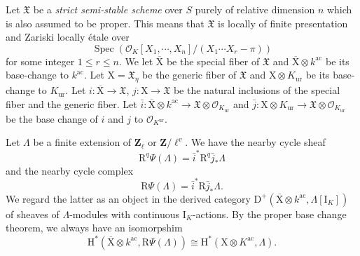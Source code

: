 \documentclass[10pt]{amsart}
\newcommand*\Z{\mathds{Z}}
\newcommand*\ZZ{|[draw,circle]| \Z_2}
\numberwithin{equation}{section}
\theoremstyle{plain}
\numberwithin{equation}{section}
\theoremstyle{definition}
\theoremstyle{remark}
\def\ac{\mathrm{ac}}
\def\ur{\mathrm{ur}}
\def\ac{\mathrm{ac}}
\DeclareMathOperator{\Spec}{Spec}
\def\calO{\mathcal{O}}
\def\ZZ{\mathbf{Z}}
\def\rmD{\mathrm{D}}
\def\rmH{\mathrm{H}}
\def\rmI{\mathrm{I}}
\def\rmX{\mathrm{X}}
\def\rmXbar{\overline{\rmX}}
\def\rmR{\mathrm{R}}
\begin{document}
Let $\mathfrak{X}$ be a \emph{strict semi-stable scheme} over $S$ purely of relative dimension $n$ which is also assumed to be proper. This means that $\mathfrak{X}$ is locally of finite presentation and Zariski locally \'{e}tale over $$\Spec(\calO_{K}[X_{1}, \cdots, X_{n}]/(X_{1}\cdots X_{r}-\pi))$$ for some integer $1\leq r\leq n$. We let $\overline{\rmX}$ be the special fiber of $\mathfrak{X}$ and $\overline{\rmX}\otimes{k^{\ac}}$ be its base-change to $k^{\ac}$. Let $\rmX=\mathfrak{X}_{\eta}$ be the generic fiber of $\mathfrak{X}$ and $\rmX\otimes{K_{\ur}}$ be its base-change to $K_{\ur}$. Let $i:\overline{\rmX}\rightarrow \mathfrak{X}$, $j: \rmX\rightarrow \mathfrak{X}$ be the natural inclusions of the special fiber and the generic fiber. Let $\bar{i}: \overline{\rmX}\otimes{k^{\ac}}\rightarrow \mathfrak{X}\otimes{\calO_{K_{\ur}}}$ and $\bar{j}: \rmX\otimes{K_{\ur}}\rightarrow \mathfrak{X}\otimes{\calO_{K_{\ur}}}$ be the base change of $i$ and $j$ to $\calO_{K^{\ur}}$. 

Let $\Lambda$ be a finite extension of $\ZZ_{\ell}$ or $\ZZ/\ell^{v}$. We have the  nearby cycle sheaf 
\begin{equation*}
\rmR^{q}\Psi(\Lambda)= \bar{i}^{*}\rmR^{q}\bar{j}_{*}\Lambda
\end{equation*}
and the {nearby cycle complex} 
\begin{equation*}
\rmR\Psi(\Lambda)= \bar{i}^{*}\rmR\bar{j}_{*}\Lambda.
\end{equation*}
We regard the latter as an object in the derived category $\rmD^{+}(\rmXbar\otimes{k^{\ac}}, \Lambda[\rmI_{K}])$ of sheaves of $\Lambda$-modules with continuous $\rmI_{K}$-actions. By the proper base change theorem, we always have an isomorpshim
\begin{equation*}
\rmH^{*}(\rmXbar\otimes{k^{\ac}}, \rmR\Psi(\Lambda))\cong\rmH^{*}(\rmX\otimes{K^{\ac}}, \Lambda).
\end{equation*} 
\end{document}
